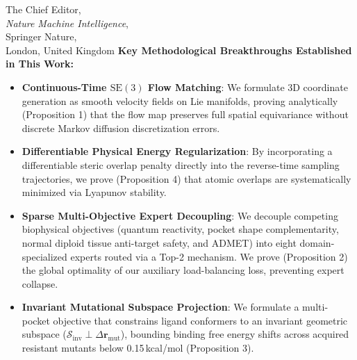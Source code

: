 \documentclass[11pt]{letter}
\begin{document}
\begin{letter}{%
    The Chief Editor,\\
    \textit{Nature Machine Intelligence},\\
    Springer Nature,\\
    London, United Kingdom
}
\textbf{Key Methodological Breakthroughs Established in This Work:}
\begin{itemize}
    \item \textbf{Continuous-Time $\mathrm{SE}(3)$ Flow Matching}: We formulate 3D coordinate generation as smooth velocity fields on Lie manifolds, proving analytically (Proposition 1) that the flow map preserves full spatial equivariance without discrete Markov diffusion discretization errors.
    \item \textbf{Differentiable Physical Energy Regularization}: By incorporating a differentiable steric overlap penalty directly into the reverse-time sampling trajectories, we prove (Proposition 4) that atomic overlaps are systematically minimized via Lyapunov stability.
    \item \textbf{Sparse Multi-Objective Expert Decoupling}: We decouple competing biophysical objectives (quantum reactivity, pocket shape complementarity, normal diploid tissue anti-target safety, and ADMET) into eight domain-specialized experts routed via a Top-2 mechanism. We prove (Proposition 2) the global optimality of our auxiliary load-balancing loss, preventing expert collapse.
    \item \textbf{Invariant Mutational Subspace Projection}: We formulate a multi-pocket objective that constrains ligand conformers to an invariant geometric subspace ($\mathcal{S}_{\text{inv}} \perp \Delta \mathbf{r}_{\text{mut}}$), bounding binding free energy shifts across acquired resistant mutants below 0.15\,kcal/mol (Proposition 3).
\end{itemize}


\end{letter}
\end{document}
